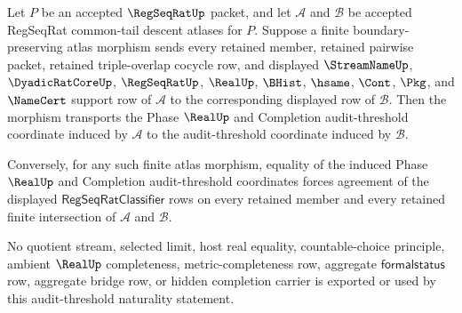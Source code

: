 \begin{theorem}
\label{thm:regseqrat-audit-threshold-atlas-naturality}
Let $P$ be an accepted $\RegSeqRatUp$ packet, and let $\mathcal A$ and $\mathcal B$ be accepted RegSeqRat common-tail descent atlases for $P$. Suppose a finite boundary-preserving atlas morphism sends every retained member, retained pairwise packet, retained triple-overlap cocycle row, and displayed $\StreamNameUp$, $\DyadicRatCoreUp$, $\RegSeqRatUp$, $\RealUp$, $\BHist$, $\hsame$, $\Cont$, $\Pkg$, and $\NameCert$ support row of $\mathcal A$ to the corresponding displayed row of $\mathcal B$. Then the morphism transports the Phase $\RealUp$ and Completion audit-threshold coordinate induced by $\mathcal A$ to the audit-threshold coordinate induced by $\mathcal B$.

Conversely, for any such finite atlas morphism, equality of the induced Phase $\RealUp$ and Completion audit-threshold coordinates forces agreement of the displayed $\mathsf{RegSeqRatClassifier}$ rows on every retained member and every retained finite intersection of $\mathcal A$ and $\mathcal B$.

No quotient stream, selected limit, host real equality, countable-choice principle, ambient $\RealUp$ completeness, metric-completeness row, aggregate $\mathsf{formalstatus}$ row, aggregate bridge row, or hidden completion carrier is exported or used by this audit-threshold naturality statement.
\end{theorem}
